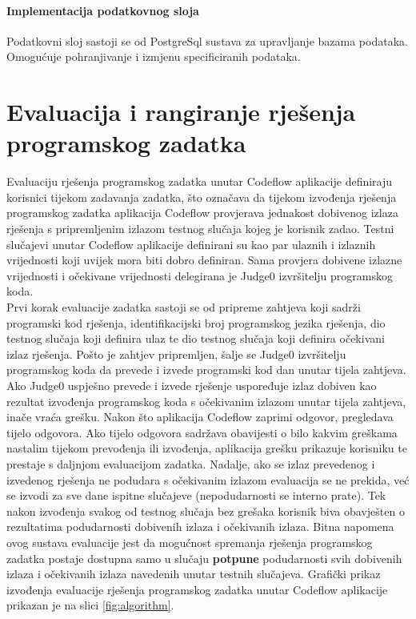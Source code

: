 \documentclass[times, utf8, zavrsni, numeric]{fer}
\begin{document}
			\subsubsection{Implementacija podatkovnog sloja}
			Podatkovni sloj sastoji se od PostgreSql sustava za upravljanje bazama podataka. Omogućuje pohranjivanje i izmjenu specificiranih podataka.
			
	\chapter{Evaluacija i rangiranje rješenja programskog zadatka}
	Evaluaciju rješenja programskog zadatka unutar Codeflow aplikacije definiraju korisnici tijekom zadavanja zadatka, što označava da tijekom izvođenja rješenja programskog zadatka aplikacija Codeflow provjerava jednakost dobivenog izlaza rješenja s pripremljenim izlazom testnog slučaja kojeg je korisnik zadao. Testni slučajevi unutar Codeflow aplikacije definirani su kao par ulaznih i izlaznih vrijednosti koji uvijek mora biti dobro definiran. Sama provjera dobivene izlazne vrijednosti i očekivane vrijednosti delegirana je Judge0 izvršitelju programskog koda.\\
	Prvi korak evaluacije zadatka sastoji se od pripreme zahtjeva koji sadrži programski kod rješenja, identifikacijski broj programskog jezika rješenja, dio testnog slučaja koji definira ulaz te dio testnog slučaja koji definira očekivani izlaz rješenja. Pošto je zahtjev pripremljen, šalje se Judge0 izvršitelju programskog koda da prevede i izvede programski kod dan unutar tijela zahtjeva. Ako Judge0 uspješno prevede i izvede rješenje uspoređuje izlaz dobiven kao rezultat izvođenja programskog koda s očekivanim izlazom unutar tijela zahtjeva, inače vraća grešku. Nakon što aplikacija Codeflow zaprimi odgovor, pregledava tijelo odgovora. Ako tijelo odgovora sadržava obavijesti o bilo kakvim greškama nastalim tijekom prevođenja ili izvođenja, aplikacija grešku prikazuje korisniku te prestaje s daljnjom evaluacijom zadatka. Nadalje, ako se izlaz prevedenog i izvedenog rješenja ne podudara s očekivanim izlazom evaluacija se ne prekida, već se izvodi za sve dane ispitne slučajeve (nepodudarnosti se interno prate). Tek nakon izvođenja svakog od testnog slučaja bez grešaka korisnik biva obavješten o rezultatima podudarnosti dobivenih izlaza i očekivanih izlaza. Bitna napomena ovog sustava evaluacije jest da mogućnost spremanja rješenja programskog zadatka postaje dostupna samo u slučaju \textbf{potpune} podudarnosti svih dobivenih izlaza i očekivanih izlaza navedenih unutar testnih slučajeva. Grafički prikaz izvođenja evaluacije rješenja programskog zadatka unutar Codeflow aplikacije prikazan je na slici \ref{fig:algorithm}.
\end{document}
